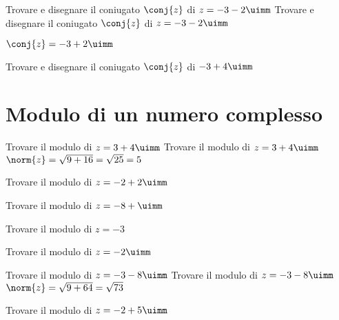 \begin{exercise}
	Trovare e disegnare il coniugato $\conj{z}$ di $z=-3-2\uimm$
	\tcblower
	Trovare e disegnare il coniugato $\conj{z}$ di $z=-3-2\uimm$
	
	$\conj{z}=-3+2\uimm$
	\begin{center}
		
		\label{fig:disegnopianocomplesso06}
	\end{center}
\end{exercise}
\begin{exercise}[no solution]
	Trovare e disegnare il coniugato $\conj{z}$ di $-3+4\uimm$
\end{exercise}
\section{Modulo di un numero complesso}
\begin{exercise}
	Trovare il modulo di $z=3+4\uimm$
	\tcblower
	Trovare il modulo di $z=3+4\uimm$
	$\norm{z}=\sqrt{9+16}=\sqrt{25}=5$
\end{exercise}
\begin{exercise}[no solution]
	Trovare il modulo di $z=-2+2\uimm$
\end{exercise}
\begin{exercise}[no solution]
	Trovare il modulo di $z=-8+\uimm$
\end{exercise}
\begin{exercise}[no solution]
	Trovare il modulo di $z=-3$
\end{exercise}
\begin{exercise}[no solution]
	Trovare il modulo di $z=-2\uimm$
\end{exercise}
 \begin{exercise}
	Trovare il modulo di $z=-3-8\uimm$
	\tcblower
	Trovare il modulo di $z=-3-8\uimm$
	$\norm{z}=\sqrt{9+64}=\sqrt{73}$
\end{exercise}
\begin{exercise}[no solution]
	Trovare il modulo di $z=-2+5\uimm$
\end{exercise}
